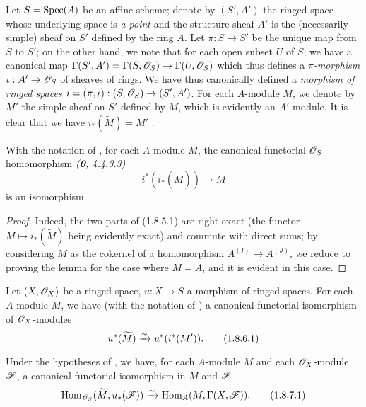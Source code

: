\begin{env}[1.8.4]
\label{1.1.8.4}
Let $S={\mathop{\mathrm{Spec}}\nolimits}(A)$ be an affine scheme; denote by $(S',A')$ the ringed space whose underlying
space is {\em a point} and the structure sheaf $A'$ is the (necessarily simple)
sheaf on $S'$ defined by the ring $A$. Let $\pi:S\to S'$ be the unique map from $S$ to $S'$;
on the other hand, we note that for each open subset $U$ of $S$, we have a canonical map
$\Gamma(S',A')=\Gamma(S,\mathscr{O}_S)\to\Gamma(U,\mathscr{O}_S)$ which thus defines a {\em $\pi$-morphism}
$\iota:A'\to\mathscr{O}_S$ of sheaves of rings. We have thus canonically defined a {\em morphism of
ringed spaces $i=(\pi,\iota):(S,\mathscr{O}_S)\to(S',A')$}. For each $A$-module $M$, we denote by
$M'$ the simple sheaf on $S'$ defined by $M$, which is evidently an $A'$-module. It is clear
that we have $i_*(\widetilde{M})=M'$ .
\end{env}

\begin{lem}[1.8.5]
\label{1.1.8.5}
With the notation of , for each $A$-module $M$, the canonical functorial
$\mathscr{O}_S$-homomorphism {\em (\textbf{0}, 4.4.3.3)}
\[
  i^*(i_*(\widetilde{M}))\longrightarrow\widetilde{M}
  \tag{1.8.5.1}
\]
is an isomorphism.
\end{lem}

\begin{proof}
\label{proof-1.1.8.5}
Indeed, the two parts of (1.8.5.1) are right exact (the functor
$M\mapsto i_*(\widetilde{M})$ being evidently exact) and commute with direct sums; by
considering $M$ as the cokernel of a homomorphism $A^{(I)}\to A^{(J)}$, we reduce to proving
the lemma for the case where $M=A$, and it is evident in this case.
\end{proof}

\begin{cor}[1.8.6]
\label{1.1.8.6}
Let $(X,\mathscr{O}_X)$ be a ringed space, $u:X\to S$ a morphism of ringed spaces.
For each $A$-module $M$, we have (with the notation of ) a canonical
functorial isomorphism of $\mathscr{O}_X$-modules
\[
  u^*(\widetilde{M})\xrightarrow{\sim} u^*(i^*(M')).
  \tag{1.8.6.1}
\]
\end{cor}

\begin{cor}[1.8.7]
\label{1.1.8.7}
Under the hypotheses of , we have, for each $A$-module $M$ and each
$\mathscr{O}_X$-module $\mathscr{F}$, a canonical functorial isomorphism in $M$ and $\mathscr{F}$
\[
  {\mathop{\mathrm{Hom}}\nolimits}_{\mathscr{O}_S}(\widetilde{M},u_*(\mathscr{F}))\xrightarrow{\sim}{\mathop{\mathrm{Hom}}\nolimits}_A(M,\Gamma(X,\mathscr{F})).
  \tag{1.8.7.1}
\]
\end{cor}

